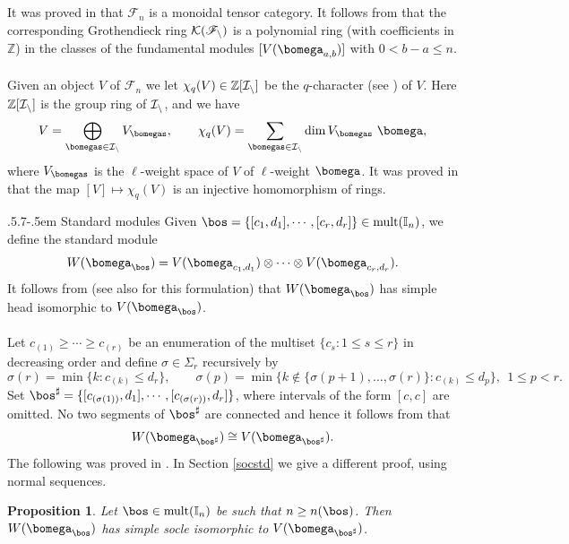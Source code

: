 \documentclass[11pt,reqno]{amsart}
\makeatletter
\newtheorem*{prop}{Proposition}
\theoremstyle{definition} \newtheorem*{defn}{Definition}
\theoremstyle{definition}
\numberwithin{equation}{section}
\def\subsection{\def\@secnumfont{\bfseries}\@startsection{subsection}{2}%
  {\parindent}{.5\linespacing\@plus.7\linespacing}{-.5em}%
  {\normalfont\bfseries}}
\makeatother
\begin{document}
\\\\
It was proved in \cite{HL10} that $\mathscr F_n$ is a monoidal tensor category. It follows from \cite{FR99} that the corresponding Grothendieck ring $\cal K(\mathscr F_n)$ is a polynomial ring (with coefficients in $\mathbb Z$) in the classes of the fundamental modules $[V(\bomega_{a,b})]$ with $0<b-a\le n$. \\\\ Given an object $V$ of $\mathscr F_n$ we let $\chi_q(V)\in\mathbb Z[\cal I_n]$ be the $q$-character (see \cite{FR99}) of $V$. Here $\mathbb Z[\cal I_n]$ is the group ring of $\cal I_n$, and we have
$$V=\bigoplus_{\bomegas\in\cal I_n} V_\bomegas, \qquad \chi_q(V)=\sum_{\bomegas\in\cal I_n}\dim V_\bomegas\ \bomega,$$
where $V_\bomegas$ is the $\ell$-weight space of $V$ of $\ell$-weight $\bomega$. It was proved in \cite{FR99} that the map $[V]\mapsto\chi_q(V)$ is an injective homomorphism of rings.


\subsection{Standard modules}\label{std} Given $\bos=\{[c_1,d_1],\cdots,[c_r,d_r]\}\in{\rm mult}(\mathbb I_n)$,
we define the standard module
$$W(\bomega_\bos)=V(\bomega_{c_1,d_1})\otimes\cdots\otimes V(\bomega_{c_r,d_r}).$$
It follows from \cite{CP94,ch01} (see also \cite[Corollary 3.2]{BC25b} for this formulation) that
$W(\bomega_{\bos})$ has simple head isomorphic to $V(\bomega_{\bos})$.
\\\\
Let
$c_{(1)}\ge\cdots\ge c_{(r)}$ be an enumeration of the multiset $\{c_s: 1\le s\le r\}$ in decreasing order and define
$\sigma\in\Sigma_r$ recursively by
$$\sigma(r)=\min\{k: c_{(k)}\le d_r\},\qquad
\sigma(p)=\min\{k\notin\{\sigma(p+1),\dots,\sigma(r)\}: c_{(k)}\le d_p\},\ \ 1\le p<r.$$
Set $\bos^\sharp=\{[c_{(\sigma(1))},d_1],\cdots,[c_{(\sigma(r))},d_r]\}$, where intervals of
the form $[c,c]$ are omitted.
No two segments of $\bos^\sharp$ are connected and hence it follows from \cite{ch01} that $$W(\bomega_{\bos^\sharp})\cong V(\bomega_{\bos^\sharp}).$$
The following was proved in \cite[Theorem 2(ii), Proposition 1.4.4]{BC25b}.  In  Section \ref{socstd} we give a different
proof, using normal sequences.
\begin{prop}\label{socW} Let $\bos\in{\rm mult}(\mathbb I_n)$ be such that $n\ge n(\bos)$. Then $W(\bomega_\bos)$ has
simple socle isomorphic to $V(\bomega_{\bos^\sharp})$.
\end{prop}
\end{document}

